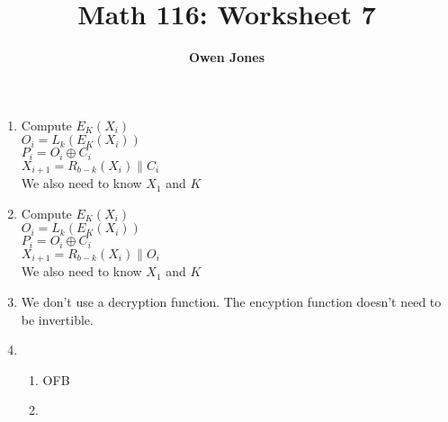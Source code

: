 \documentclass[10pt]{article}
\title{\bf Math 116: Worksheet 7}
\author{\bf Owen Jones}
\begin{document}
\maketitle
\begin{enumerate}
    \item Compute $E_K(X_i)$\\
    $O_i=L_k(E_K(X_i))$\\
    $P_i=O_i\oplus C_i$\\
    $X_{i+1}=R_{b-k}(X_i)\parallel C_i$\\
    We also need to know $X_1$ and $K$
    \item Compute $E_K(X_i)$\\
    $O_i=L_k(E_K(X_i))$\\
    $P_i=O_i\oplus C_i$\\
    $X_{i+1}=R_{b-k}(X_i)\parallel O_i$\\
    We also need to know $X_1$ and $K$
    \item We don't use a decryption function. The encyption function doesn't need to be invertible.
    \item \begin{enumerate}
        \item OFB
        \item 
    \end{enumerate}
\end{enumerate}
\end{document}
